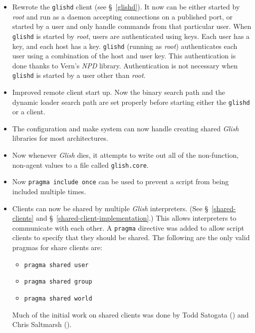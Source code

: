 \begin{itemize}
\item Rewrote the \texttt{glishd} client (see \S~\ref{glishd}). It now
can be either
started by \emph{root} and run as a daemon accepting connections on a published
port, or started by a user and only handle commands from that particular
user. When \texttt{glishd} is started by \emph{root}, users are authenticated
using keys. Each user has a key, and each host has a key. \texttt{glishd}
(running as \emph{root}) authenticates each user using a combination of the
host and user key. This authentication is done thanks to Vern's \emph{NPD}
library. Authentication is not necessary when \texttt{glishd} is started by a
user other than \emph{root}.

\item Improved remote client start up. Now the binary search path and the
dynamic loader search path are set properly before starting either the
\texttt{glishd} or a client.

\item The configuration and make system can now handle creating shared
\emph{Glish}
libraries for most architectures.

\item Now whenever \emph{Glish} dies, it attempts to write out all of the non-function,
non-agent values to a file called \texttt{glish.core}.

\item Now \verb+pragma include once+ can be used to prevent a script from being
included multiple times.

\item Clients can now be shared by multiple \emph{Glish} interpreters.  (See 
\S~\ref{shared-clients} and \S~\ref{shared-client-implementation}.) This allows
interpreters to communicate with each other. A \texttt{pragma} directive was added
to allow script clients to specify that they should be shared. The following are
the only valid pragmas for share clients are:
\begin{itemize}
\item \verb+pragma shared user+
\item \verb+pragma shared group+
\item \verb+pragma shared world+
\end{itemize}
Much of the initial work on shared clients was done by Todd Satogata
() and
Chris Saltmarsh
().


\end{itemize}
